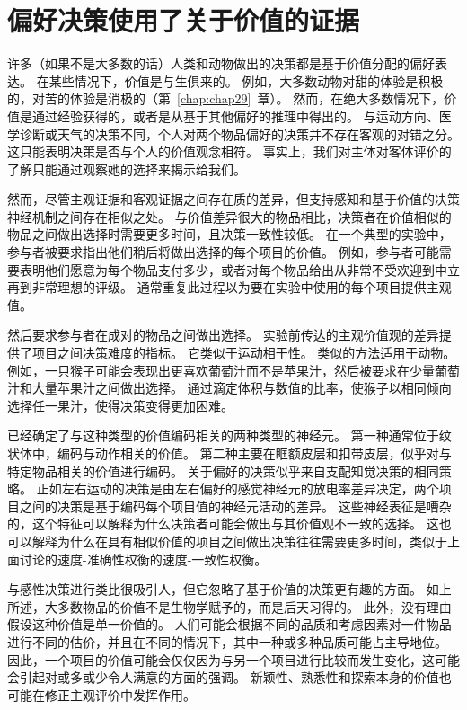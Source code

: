 \section{偏好决策使用了关于价值的证据}

许多（如果不是大多数的话）人类和动物做出的决策都是基于价值分配的偏好表达。 
在某些情况下，价值是与生俱来的。
例如，大多数动物对甜的体验是积极的，对苦的体验是消极的（第~\ref{chap:chap29}~章）。
然而，在绝大多数情况下，价值是通过经验获得的，或者是从基于其他偏好的推理中得出的。
与运动方向、医学诊断或天气的决策不同，个人对两个物品偏好的决策并不存在客观的对错之分。
这只能表明决策是否与个人的价值观念相符。
事实上，我们对主体对客体评价的了解只能通过观察她的选择来揭示给我们。


然而，尽管主观证据和客观证据之间存在质的差异，但支持感知和基于价值的决策神经机制之间存在相似之处。
与价值差异很大的物品相比，决策者在价值相似的物品之间做出选择时需要更多时间，且决策一致性较低。
在一个典型的实验中，参与者被要求指出他们稍后将做出选择的每个项目的价值。
例如，参与者可能需要表明他们愿意为每个物品支付多少，或者对每个物品给出从非常不受欢迎到中立再到非常理想的评级。
通常重复此过程以为要在实验中使用的每个项目提供主观值。


然后要求参与者在成对的物品之间做出选择。
实验前传达的主观价值观的差异提供了项目之间决策难度的指标。
它类似于运动相干性。
类似的方法适用于动物。
例如，一只猴子可能会表现出更喜欢葡萄汁而不是苹果汁，然后被要求在少量葡萄汁和大量苹果汁之间做出选择。
通过滴定体积与数值的比率，使猴子以相同倾向选择任一果汁，使得决策变得更加困难。


已经确定了与这种类型的价值编码相关的两种类型的神经元。
第一种通常位于纹状体中，编码与动作相关的价值。
第二种主要在眶额皮层和扣带皮层，似乎对与特定物品相关的价值进行编码。
关于偏好的决策似乎来自支配知觉决策的相同策略。
正如左右运动的决策是由左右偏好的感觉神经元的放电率差异决定，两个项目之间的决策是基于编码每个项目值的神经元活动的差异。
这些神经表征是嘈杂的，这个特征可以解释为什么决策者可能会做出与其价值观不一致的选择。
这也可以解释为什么在具有相似价值的项目之间做出决策往往需要更多时间，类似于上面讨论的速度-准确性权衡的速度-一致性权衡。


与感性决策进行类比很吸引人，但它忽略了基于价值的决策更有趣的方面。
如上所述，大多数物品的价值不是生物学赋予的，而是后天习得的。
此外，没有理由假设这种价值是单一价值的。
人们可能会根据不同的品质和考虑因素对一件物品进行不同的估价，并且在不同的情况下，其中一种或多种品质可能占主导地位。
因此，一个项目的价值可能会仅仅因为与另一个项目进行比较而发生变化，这可能会引起对或多或少令人满意的方面的强调。
新颖性、熟悉性和探索本身的价值也可能在修正主观评价中发挥作用。


